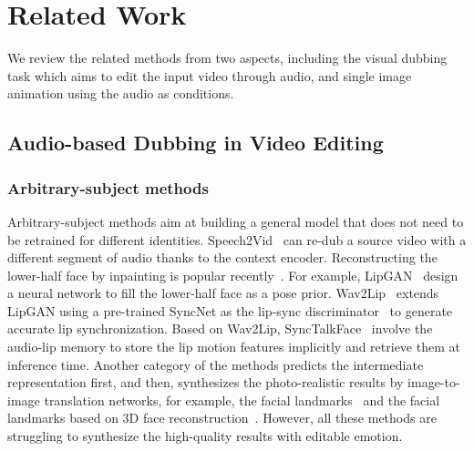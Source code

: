 

\section{Related Work}
We review the related methods from two aspects, including the visual dubbing task which aims to edit the input video through audio, and single image animation using the audio as conditions.

\subsection{Audio-based Dubbing in Video Editing}

\subsubsection{Arbitrary-subject methods}
Arbitrary-subject methods aim at building a general model that does not need to be retrained for different identities.
Speech2Vid~\cite{Chung17b} can re-dub a source video with a different segment of audio thanks to the context encoder. %
Reconstructing the lower-half face by inpainting is popular recently~\cite{lipgan, wav2lip, park2022synctalkface}. For example, LipGAN~\cite{lipgan} design a neural network to fill the lower-half face as a pose prior. Wav2Lip~\cite{wav2lip} extends LipGAN using a pre-trained SyncNet as the lip-sync discriminator~\cite{syncnet} to generate accurate lip synchronization. Based on Wav2Lip, SyncTalkFace~\cite{park2022synctalkface} involve the audio-lip memory to store the lip motion features implicitly and retrieve them at inference time. Another category of the methods predicts the intermediate representation first, and then, synthesizes the photo-realistic results by image-to-image translation networks, for example, the facial landmarks~\cite{xie2021towards} and the facial landmarks based on 3D face reconstruction~\cite{song2022everybody}. However, all these methods are struggling to synthesize the high-quality results with editable emotion. 

